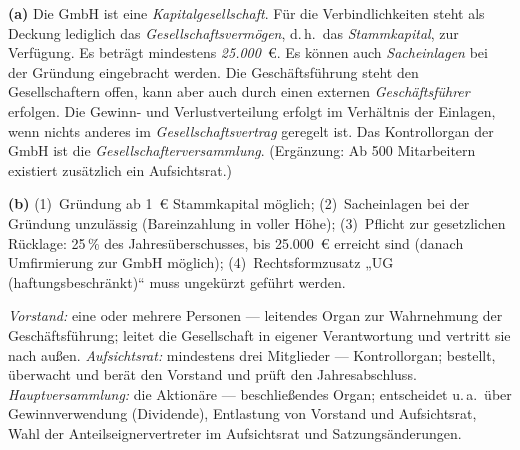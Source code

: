 \documentclass[11pt, a4paper]{article}
\begin{document}
\begin{loesung}[title={Lösung Aufgabe~7 --- GmbH und UG}]
\textbf{(a)} Die GmbH ist eine \emph{Kapitalgesellschaft}. Für die Verbindlichkeiten
steht als Deckung lediglich das \emph{Gesellschaftsvermögen}, d.\,h.\ das
\emph{Stammkapital}, zur Verfügung. Es beträgt mindestens \emph{25.000}~€. Es können auch
\emph{Sacheinlagen} bei der Gründung eingebracht werden. Die Geschäftsführung steht den
Gesellschaftern offen, kann aber auch durch einen externen \emph{Geschäftsführer}
erfolgen. Die Gewinn- und Verlustverteilung erfolgt im Verhältnis der Einlagen, wenn
nichts anderes im \emph{Gesellschaftsvertrag} geregelt ist. Das Kontrollorgan der GmbH
ist die \emph{Gesellschafterversammlung}. (Ergänzung: Ab 500 Mitarbeitern existiert
zusätzlich ein Aufsichtsrat.)

\textbf{(b)} (1)~Gründung ab 1~€ Stammkapital möglich; (2)~Sacheinlagen bei der Gründung
unzulässig (Bareinzahlung in voller Höhe); (3)~Pflicht zur gesetzlichen Rücklage: 25\,\%
des Jahresüberschusses, bis 25.000~€ erreicht sind (danach Umfirmierung zur GmbH
möglich); (4)~Rechtsformzusatz „UG (haftungsbeschränkt)`` muss ungekürzt geführt werden.
\end{loesung}

\begin{loesung}[title={Lösung Aufgabe~8 --- Organe der AG}]
\emph{Vorstand:} eine oder mehrere Personen --- leitendes Organ zur Wahrnehmung der
Geschäftsführung; leitet die Gesellschaft in eigener Verantwortung und vertritt sie nach
außen.
\emph{Aufsichtsrat:} mindestens drei Mitglieder --- Kontrollorgan; bestellt, überwacht
und berät den Vorstand und prüft den Jahresabschluss.
\emph{Hauptversammlung:} die Aktionäre --- beschließendes Organ; entscheidet u.\,a.\ über
Gewinnverwendung (Dividende), Entlastung von Vorstand und Aufsichtsrat, Wahl der
Anteilseignervertreter im Aufsichtsrat und Satzungsänderungen.
\end{loesung}
\end{document}
